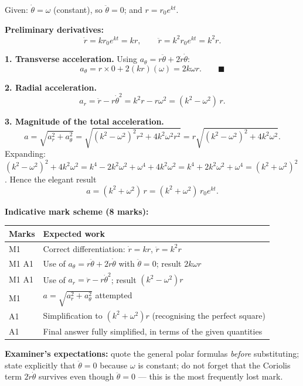 \documentclass[11pt]{article}
\begin{document}
\begin{corrige}
Given: $\dot{\theta} = \omega$ (constant), so $\ddot{\theta} = 0$; and $r = r_0 e^{kt}$.

\textbf{Preliminary derivatives:}
\[ \dot{r} = k r_0 e^{kt} = kr, \qquad \ddot{r} = k^2 r_0 e^{kt} = k^2 r. \]

\textbf{1. Transverse acceleration.} Using $a_\theta = r\ddot{\theta} + 2\dot{r}\dot{\theta}$:
\[ a_\theta = r \times 0 + 2(kr)(\omega) = 2k\omega r. \qquad \blacksquare \]

\textbf{2. Radial acceleration.}
\[ a_r = \ddot{r} - r\dot{\theta}^2 = k^2 r - r\omega^2 = (k^2 - \omega^2)\,r. \]

\textbf{3. Magnitude of the total acceleration.}
\[ a = \sqrt{a_r^2 + a_\theta^2} = \sqrt{(k^2-\omega^2)^2 r^2 + 4k^2\omega^2 r^2} = r\sqrt{(k^2-\omega^2)^2 + 4k^2\omega^2}. \]
Expanding: $(k^2-\omega^2)^2 + 4k^2\omega^2 = k^4 - 2k^2\omega^2 + \omega^4 + 4k^2\omega^2 = k^4 + 2k^2\omega^2 + \omega^4 = (k^2+\omega^2)^2$. Hence the elegant result
\[ a = (k^2 + \omega^2)\,r = (k^2+\omega^2)\,r_0 e^{kt}. \]

\textbf{Indicative mark scheme (8 marks):}
\begin{center}
\begin{tabularx}{\linewidth}{|l|X|}
\hline
\rowcolor{popblueL} \textbf{Marks} & \textbf{Expected work} \\
\hline
M1 & Correct differentiation: $\dot r = kr$, $\ddot r = k^2 r$ \\
\hline
M1 A1 & Use of $a_\theta = r\ddot\theta + 2\dot r\dot\theta$ with $\ddot\theta = 0$; result $2k\omega r$ \\
\hline
M1 A1 & Use of $a_r = \ddot r - r\dot\theta^2$; result $(k^2-\omega^2)r$ \\
\hline
M1 & $a = \sqrt{a_r^2 + a_\theta^2}$ attempted \\
\hline
A1 & Simplification to $(k^2+\omega^2)r$ (recognising the perfect square) \\
\hline
A1 & Final answer fully simplified, in terms of the given quantities \\
\hline
\end{tabularx}
\end{center}

\textbf{Examiner's expectations:} quote the general polar formulas \emph{before} substituting; state explicitly that $\ddot\theta = 0$ because $\omega$ is constant; do not forget that the Coriolis term $2\dot r\dot\theta$ survives even though $\ddot\theta = 0$ — this is the most frequently lost mark.
\end{corrige}
\end{document}
